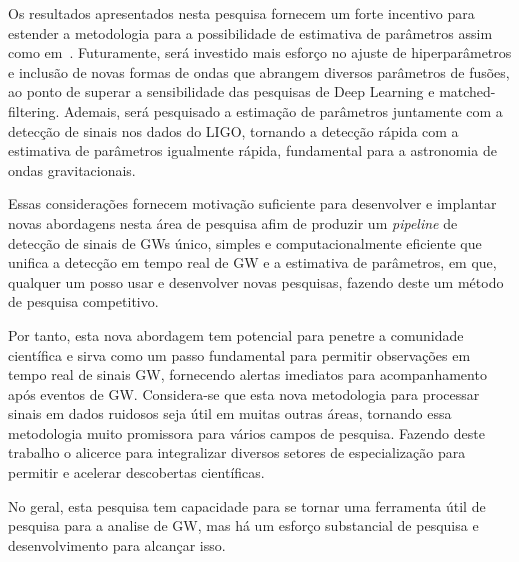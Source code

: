 Os resultados apresentados nesta pesquisa fornecem um forte incentivo para estender a metodologia para a possibilidade de estimativa de parâmetros assim como em~\cite{PhysRevD.97.044039,GEORGE201864}. Futuramente, será investido mais esforço no ajuste de hiperparâmetros e inclusão de novas formas de ondas que abrangem diversos parâmetros de fusões, ao ponto de superar a sensibilidade das pesquisas de Deep Learning e matched-filtering. Ademais, será pesquisado a estimação de parâmetros juntamente com a detecção de sinais nos dados do LIGO, tornando a detecção rápida com a estimativa de parâmetros igualmente rápida, fundamental para a astronomia de ondas gravitacionais.

Essas considerações fornecem motivação suficiente para desenvolver e implantar novas abordagens nesta área de pesquisa afim de produzir um \textit{pipeline} de detecção de sinais de GWs único, simples e computacionalmente eficiente que unifica a detecção em tempo real de GW e a estimativa de parâmetros, em que, qualquer um posso usar e desenvolver novas pesquisas, fazendo deste um método de pesquisa competitivo.

Por tanto, esta nova abordagem tem potencial para penetre a comunidade científica e sirva como um passo fundamental para permitir observações em tempo real de sinais GW, fornecendo alertas imediatos para acompanhamento após eventos de GW. Considera-se que esta nova metodologia para processar sinais em dados ruidosos seja útil em muitas outras áreas, tornando essa metodologia muito promissora para vários campos de pesquisa. Fazendo deste trabalho o alicerce para integralizar diversos setores de especialização para permitir e acelerar descobertas científicas.

No geral, esta pesquisa tem capacidade para se tornar uma ferramenta útil de pesquisa para a analise de GW, mas há um esforço substancial de pesquisa e desenvolvimento para alcançar isso.
